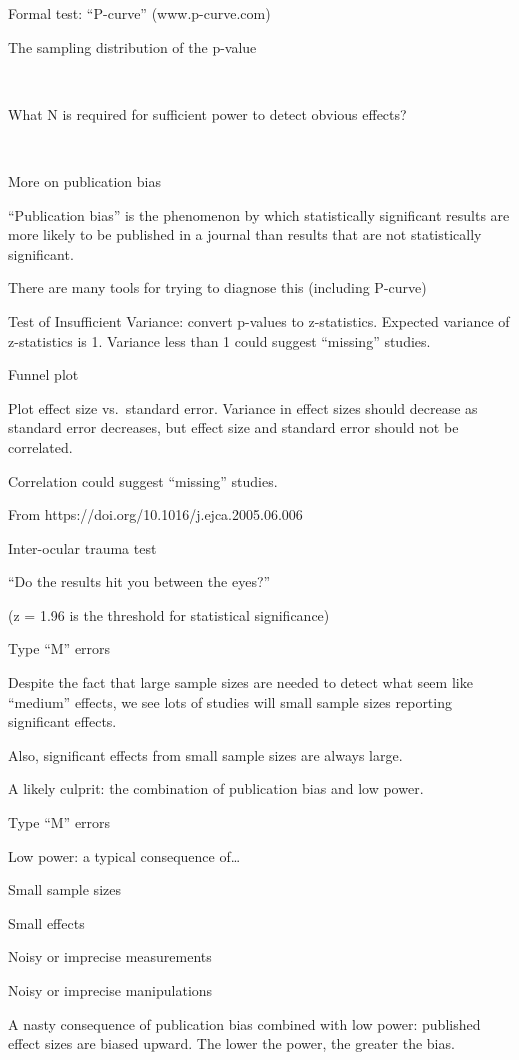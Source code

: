 \documentclass[
  letterpaper,
  DIV=11,
  numbers=noendperiod]{scrreprt}
\begin{document}
Formal test: ``P-curve'' (www.p-curve.com)

The sampling distribution of the p-value

~

What N is required for sufficient power to detect obvious effects?

~

More on publication bias

``Publication bias'' is the phenomenon by which statistically
significant results are more likely to be published in a journal than
results that are not statistically significant.

There are many tools for trying to diagnose this (including P-curve)

Test of Insufficient Variance: convert p-values to z-statistics.
Expected variance of z-statistics is 1. Variance less than 1 could
suggest ``missing'' studies.

Funnel plot

Plot effect size vs.~standard error. Variance in effect sizes should
decrease as standard error decreases, but effect size and standard error
should not be correlated.

Correlation could suggest ``missing'' studies.

From https://doi.org/10.1016/j.ejca.2005.06.006

Inter-ocular trauma test

``Do the results hit you between the eyes?''

(z = 1.96 is the threshold for statistical significance)

Type ``M'' errors

Despite the fact that large sample sizes are needed to detect what seem
like ``medium'' effects, we see lots of studies will small sample sizes
reporting significant effects.

Also, significant effects from small sample sizes are always large.

A likely culprit: the combination of publication bias and low power.

Type ``M'' errors

Low power: a typical consequence of\ldots{}

Small sample sizes

Small effects

Noisy or imprecise measurements

Noisy or imprecise manipulations

A nasty consequence of publication bias combined with low power:
published effect sizes are biased upward. The lower the power, the
greater the bias.
\end{document}
